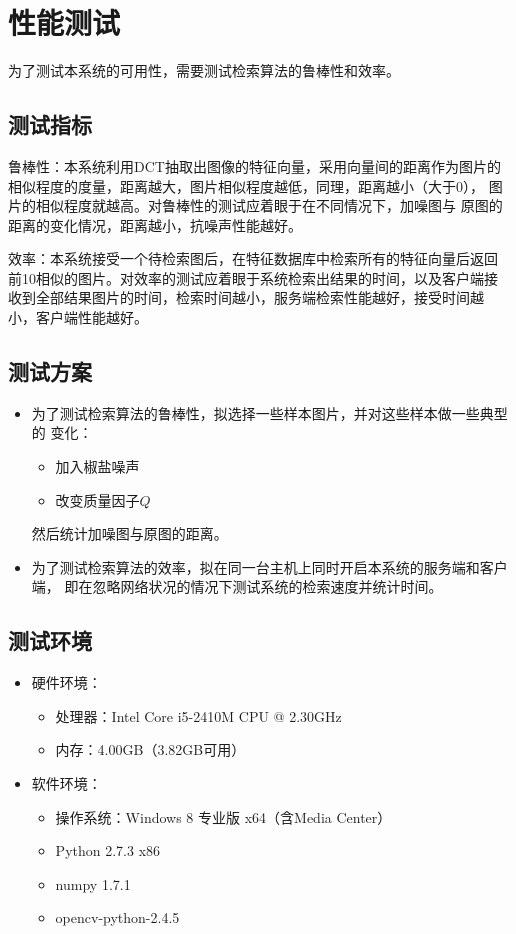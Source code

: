 
\chapter{性能测试}
\label{chap:benchmark}

为了测试本系统的可用性，需要测试检索算法的鲁棒性和效率。

\section{测试指标}
\label{sec:benchmark-index}
鲁棒性：本系统利用DCT抽取出图像的特征向量，采用向量间的距离作为图片的
相似程度的度量，距离越大，图片相似程度越低，同理，距离越小（大于0），
图片的相似程度就越高。对鲁棒性的测试应着眼于在不同情况下，加噪图与
原图的距离的变化情况，距离越小，抗噪声性能越好。

效率：本系统接受一个待检索图后，在特征数据库中检索所有的特征向量后返回
前10相似的图片。对效率的测试应着眼于系统检索出结果的时间，以及客户端接
收到全部结果图片的时间，检索时间越小，服务端检索性能越好，接受时间越
小，客户端性能越好。

\section{测试方案}
\label{sec:benchmark-scheme}

\begin{itemize}
\item 为了测试检索算法的鲁棒性，拟选择一些样本图片，并对这些样本做一些典型的
变化：
\begin{itemize}
\item 加入椒盐噪声
\item 改变质量因子$Q$
\end{itemize}
然后统计加噪图与原图的距离。

\item 为了测试检索算法的效率，拟在同一台主机上同时开启本系统的服务端和客户端，
即在忽略网络状况的情况下测试系统的检索速度并统计时间。
\end{itemize}

\section{测试环境}
\label{sec:benchmark-env}

\begin{itemize}
\item 硬件环境：
\begin{itemize}
\item 处理器：Intel Core i5-2410M CPU @ 2.30GHz
\item 内存：4.00GB（3.82GB可用）
\end{itemize}
\item 软件环境：
\begin{itemize}
\item 操作系统：Windows 8 专业版 x64（含Media Center） 
\item Python 2.7.3 x86
\item numpy 1.7.1
\item opencv-python-2.4.5
\end{itemize}
\end{itemize}

